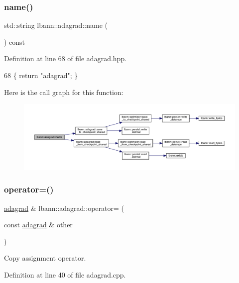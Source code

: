 \subsubsection{\texorpdfstring{name()}{name()}}
{\footnotesize\ttfamily std\+::string lbann\+::adagrad\+::name (\begin{DoxyParamCaption}{ }\end{DoxyParamCaption}) const\hspace{0.3cm}{\ttfamily [inline]}}



Definition at line 68 of file adagrad.\+hpp.


\begin{DoxyCode}
68 \{ \textcolor{keywordflow}{return} \textcolor{stringliteral}{"adagrad"}; \}
\end{DoxyCode}
Here is the call graph for this function\+:\nopagebreak
\begin{figure}[H]
\begin{center}
\leavevmode
\includegraphics[width=350pt]{classlbann_1_1adagrad_af0fe80dbe6525509aae3ef2dea62a018_cgraph}
\end{center}
\end{figure}
\mbox{\label{classlbann_1_1adagrad_a9c9b59e0dfdfa32a3a9596a38fd95af6}} 
\subsubsection{\texorpdfstring{operator=()}{operator=()}}
{\footnotesize\ttfamily \hyperlink{classlbann_1_1adagrad}{adagrad} \& lbann\+::adagrad\+::operator= (\begin{DoxyParamCaption}\item[{const \hyperlink{classlbann_1_1adagrad}{adagrad} \&}]{other }\end{DoxyParamCaption})}

Copy assignment operator. 

Definition at line 40 of file adagrad.\+cpp.


